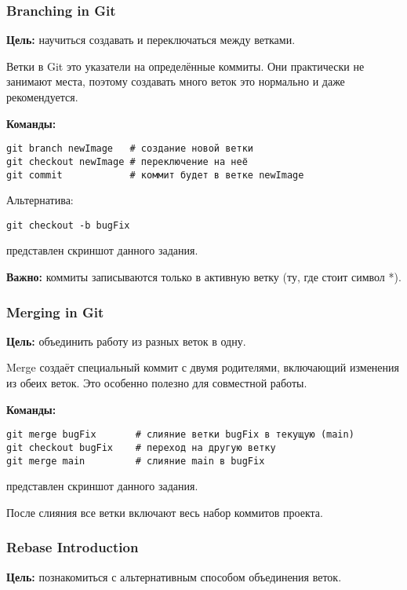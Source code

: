 \documentclass[a4paper,12pt]{report}
\begin{document}
\subsubsection{Branching in Git}
\textbf{Цель:} научиться создавать и переключаться между ветками.

Ветки в Git \textendash{} это указатели на определённые коммиты. Они практически не занимают места, поэтому создавать много веток \textendash{} это нормально и даже рекомендуется.

\textbf{Команды:}
\begin{verbatim}
git branch newImage   # создание новой ветки
git checkout newImage # переключение на неё
git commit            # коммит будет в ветке newImage
\end{verbatim}

Альтернатива:
\begin{verbatim}
git checkout -b bugFix
\end{verbatim}

 представлен скриншот данного задания.

\textbf{Важно:} коммиты записываются только в активную ветку (ту, где стоит символ *).

\subsubsection{Merging in Git}
\textbf{Цель:} объединить работу из разных веток в одну.

Merge создаёт специальный коммит с двумя родителями, включающий изменения из обеих веток. Это особенно полезно для совместной работы.

\textbf{Команды:}
\begin{verbatim}
git merge bugFix       # слияние ветки bugFix в текущую (main)
git checkout bugFix    # переход на другую ветку
git merge main         # слияние main в bugFix
\end{verbatim}

 представлен скриншот данного задания.

После слияния все ветки включают весь набор коммитов проекта.

\subsubsection{Rebase Introduction}
\textbf{Цель:} познакомиться с альтернативным способом объединения веток.
\end{document}
